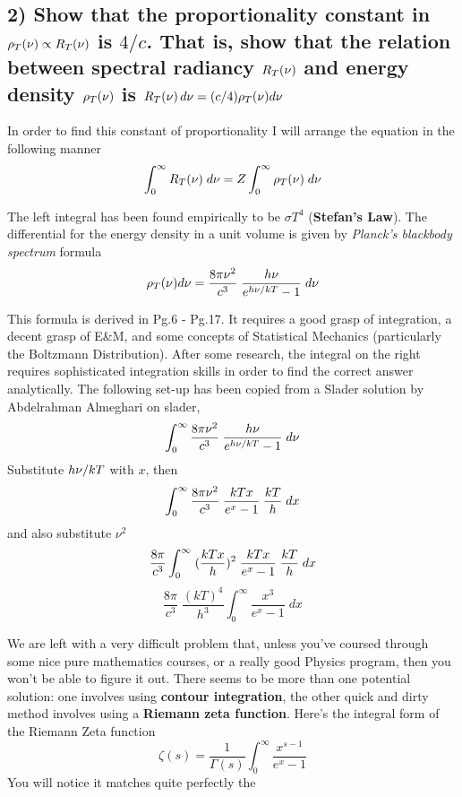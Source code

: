 \documentclass[12pt]{report}
\begin{document}
\subsection*{2) Show that the proportionality constant in \(\rho_T(\nu) \propto R_T(\nu)\) is \(4/c\). That is, show that the relation between spectral radiancy \(R_T(\nu)\) and energy density \(\rho_T(\nu)\) is \(R_T(\nu)\,d\nu = (c/4)\rho_T(\nu) d\nu\)}
In order to find this constant of proportionality I will arrange the equation in the following manner 
\[\int_0^{\infty}{R_T(\nu)\;d\nu} = Z\int_0^{\infty}{\rho_T(\nu)\;d\nu}\]

The left integral has been found empirically to be \(\sigma T^4\) (\textbf{Stefan's Law}). The differential for the energy density in a unit volume is given by \textit{Planck's blackbody spectrum} formula
\[\rho_T(\nu) d\nu = \frac{8 \pi \nu^2}{c^3}\;\frac{h\nu}{e^{h\nu /kT} - 1}\; d\nu\]

This formula is derived in Pg.6 - Pg.17. It requires a good grasp of integration, a decent grasp of E\&M, and some concepts of Statistical Mechanics (particularly the Boltzmann Distribution). After some research, the integral on the right requires sophisticated integration skills in order to find the correct answer analytically. The following set-up has been copied from a Slader solution by Abdelrahman Almeghari on slader,
\[\int_0^\infty \frac{8 \pi \nu^2}{c^3}\;\frac{h\nu}{e^{h\nu /kT} - 1}\; d\nu\]
Substitute \(h\nu/kT\) with \(x\), then
\[\int_0^\infty \frac{8 \pi \nu^2}{c^3}\;\frac{kTx}{e^{x} - 1}\; \frac{kT}{h}\; dx\]
and also substitute \(\nu^2\)
\[\frac{8 \pi}{c^3}\int_0^\infty\;(\frac{kTx}{h})^2\;\frac{kTx}{e^{x} - 1}\; \frac{kT}{h}\; dx\]
\[\frac{8 \pi}{c^3}\;\frac{(kT)^4}{h^3}\int_0^\infty\frac{x^3}{e^{x} - 1}\;dx\]

We are left with a very difficult problem that, unless you've coursed through some nice pure mathematics courses, or a really good Physics program, then you won't be able to figure it out. There seems to be more than one potential solution: one involves using \textbf{contour integration}, the other quick and dirty method involves using a \textbf{Riemann zeta function}. Here's the integral form of the Riemann Zeta function
\[\zeta(s) = \frac{1}{\Gamma(s)}\int_0^\infty\frac{x^{s-1}}{e^x - 1}\]
You will notice it matches quite perfectly the 
\end{document}
